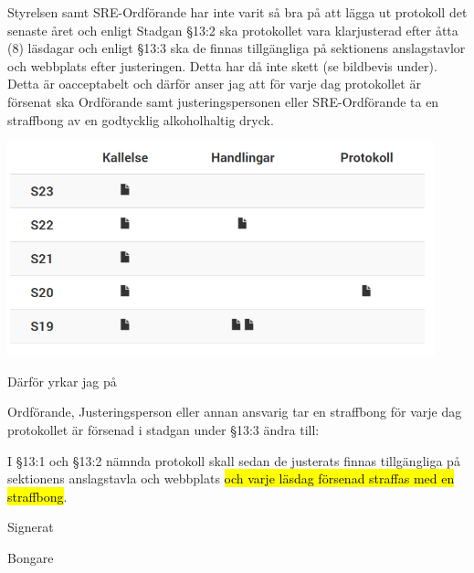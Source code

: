 \documentclass[../_main/handlingar.tex]{subfiles}
\begin{document}
Styrelsen samt SRE-Ordförande har inte varit så bra på att lägga ut protokoll det senaste året och
enligt Stadgan \S13:2 ska protokollet vara klarjusterad efter åtta (8) läsdagar och enligt §13:3 ska de
finnas tillgängliga på sektionens anslagstavlor och webbplats efter justeringen. Detta har då inte
skett (se bildbevis under). Detta är oacceptabelt och därför anser jag att för varje dag protokollet är
försenat ska Ordförande samt justeringspersonen eller SRE-Ordförande ta en straffbong av en
godtycklig alkoholhaltig dryck.

\begin{center}
  \includegraphics{../_res/protokoll.png}
\end{center}

Därför yrkar jag på

\begin{attsatser}
\att Ordförande, Justeringsperson eller annan ansvarig tar en straffbong för varje dag protokollet är
försenad
\att i stadgan under \S13:3 ändra till:\par
I \S13:1 och \S13:2 nämnda protokoll skall sedan de justerats finnas
tillgängliga på sektionens anslagstavla och webbplats \hl{och varje läsdag försenad straffas med en straffbong}.

\changenote
\end{attsatser}
\begin{signatures}{1}
    Signerat
    \signature{Godtycklig Sektionsmedlem}{Bongare}
\end{signatures}
\end{document}
